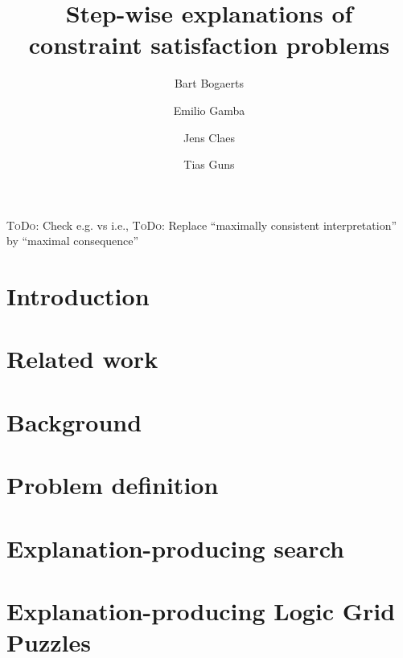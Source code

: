 \documentclass{ecai}
\newcommand\todo[1]{{\color{pink}\textsc{ToDo}: #1}}
\begin{document}
\title{Step-wise explanations of constraint satisfaction problems}

\author{Bart Bogaerts \and Emilio Gamba\footnotemark[1] \and Jens Claes \and Tias Guns\footnotemark[1] }

\maketitle


\begin{abstract}

\end{abstract}

\todo{Check e.g. vs i.e., }
\todo{Replace ``maximally consistent interpretation'' by ``maximal consequence''}


\section{Introduction}


\section{Related work}


\section{Background}


\section{Problem definition}



\section{Explanation-producing search}\label{sec:expl-gen-prod}



\section{Explanation-producing Logic Grid Puzzles}

\end{document}
